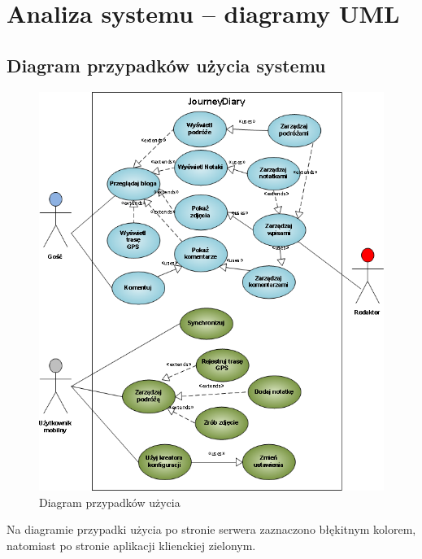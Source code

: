 \documentclass[11pt,a4paper]{article}
\begin{document}
\section {Analiza systemu – diagramy UML}
\subsection {Diagram przypadków użycia systemu}
\begin{figure}[h]
    \includegraphics[scale=0.66]{use_case.png}
    \caption{Diagram przypadków użycia}
 \end{figure}
Na diagramie przypadki użycia po stronie serwera zaznaczono błękitnym kolorem, natomiast po stronie aplikacji klienckiej zielonym.

\newpage
\end{document}
